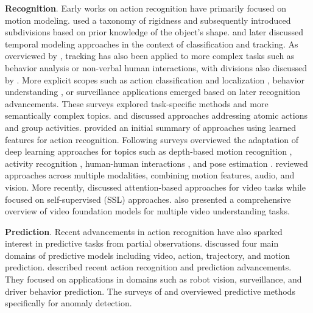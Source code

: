 \noindent
\textbf{Recognition}. Early works on action recognition have primarily focused on motion modeling. \citet{aggarwal1994articulated} used a taxonomy of rigidness and subsequently \citep{aggarwal1998nonrigid} introduced subdivisions based on prior knowledge of the object's shape. \citet{cedras1995motion} and later \citet{moeslund2001survey} discussed temporal modeling approaches in the context of classification and tracking. As overviewed by \citet{buxton2003learning}, tracking has also been applied to more complex tasks such as behavior analysis or non-verbal human interactions, with divisions also discussed by \citet{poppe2007vision}. 
More explicit scopes such as action classification and localization \citep{weinland2011survey}, behavior understanding \citep{chaaraoui2012review}, or surveillance applications \citep{vishwakarma2013survey} emerged based on later recognition advancements. These surveys explored task-specific methods and more semantically complex topics. \citet{turaga2008machine} and \citet{poppe2010survey} discussed approaches addressing atomic actions and group activities. \citet{herath2017going} provided an initial summary of approaches using learned features for action recognition. Following surveys overviewed the adaptation of deep learning approaches for topics such as depth-based motion recognition \citep{wang2018rgb}, activity recognition \citep{beddiar2020vision}, human-human interactions \citep{stergiou2019analyzing}, and pose estimation \citep{zheng2020deep}. \citet{sun2022human} reviewed approaches across multiple modalities, combining motion features, audio, and vision. More recently, \citet{selva2023video} discussed attention-based approaches for video tasks while \citet{schiappa2023self} focused on self-supervised (SSL) approaches. \citet{madan2024foundation} also presented a comprehensive overview of video foundation models for multiple video understanding tasks.

\noindent
\textbf{Prediction}. Recent advancements in action recognition have also sparked interest in predictive tasks from partial observations. \citet{rasouli2020deep} discussed four main domains of predictive models including video, action, trajectory, and motion prediction. \citet{kong2022human} described recent action recognition and prediction advancements. They focused on applications in domains such as robot vision, surveillance, and driver behavior prediction. The surveys of \citet{dhiman2019review} and \citet{ramachandra2020survey} overviewed predictive methods specifically for anomaly detection.

